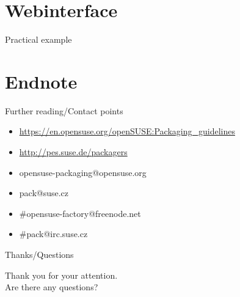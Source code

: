 \documentclass{beamer}
\begin{document}
\section{Webinterface}

\begin{frame}{Practical example}
\end{frame}

\section{Endnote}

\begin{frame}[t]{Further reading/Contact points}
	\begin{itemize}
	\item \url{https://en.opensuse.org/openSUSE:Packaging\_guidelines}
	\item \url{http://pes.suse.de/packagers}
	\item opensuse-packaging@opensuse.org
	\item pack@suse.cz
	\item \#opensuse-factory@freenode.net 
	\item \#pack@irc.suse.cz
	\end{itemize}
\end{frame}

\begin{frame}{Thanks/Questions}
	\begin{center}
	Thank you for your attention.\\
	Are there any questions?
	\end{center}
\end{frame}
\end{document}
